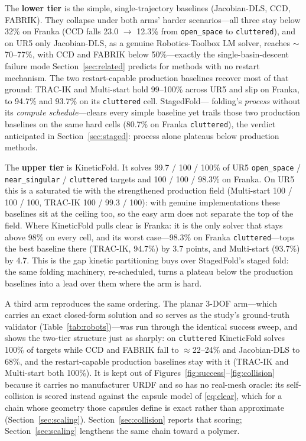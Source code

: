 \documentclass[10pt,conference]{IEEEtran}
\begin{document}
The \textbf{lower tier} is the simple, single-trajectory baselines
(Jacobian-DLS, CCD, FABRIK). They collapse under both arms' harder
scenarios---all three stay below 32\% on Franka (CCD falls 23.0
$\rightarrow$ 12.3\% from \texttt{open\_space} to \texttt{cluttered}), and on UR5
only Jacobian-DLS, as a genuine Robotics-Toolbox LM solver, reaches
$\sim$70--77\%, with CCD and FABRIK below 50\%---exactly the
single-basin-descent failure mode Section~\ref{sec:related} predicts for methods
with no restart mechanism. The two restart-capable production baselines recover
most of that ground: TRAC-IK and Multi-start hold 99--100\% across UR5 and slip
on Franka, to 94.7\% and 93.7\% on its \texttt{cluttered} cell. StagedFold---
folding's \emph{process} without its \emph{compute schedule}---clears every
simple baseline yet trails those two production baselines on the same hard cells
(80.7\% on Franka \texttt{cluttered}), the verdict anticipated in
Section~\ref{sec:staged}: process alone plateaus below production methods.

% 
% 

The \textbf{upper tier} is KineticFold. It solves 99.7 / 100 / 100\% of UR5
\texttt{open\_space} / \texttt{near\_singular} / \texttt{cluttered} targets and
100 / 100 / 98.3\% on Franka. On UR5 this is a saturated tie with the
strengthened production field (Multi-start 100 / 100 / 100, TRAC-IK
100 / 99.3 / 100): with genuine implementations these baselines sit at the
ceiling too, so the easy arm does not separate the top of the field. Where
KineticFold pulls clear is Franka: it is the only solver that stays above 98\% on
every cell, and its worst case---98.3\% on Franka \texttt{cluttered}---tops the
best baseline there (TRAC-IK, 94.7\%) by 3.7 points, and Multi-start (93.7\%) by
4.7. This is the gap kinetic partitioning buys over StagedFold's staged fold: the
same folding machinery, re-scheduled, turns a plateau below the production
baselines into a lead over them where the arm is hard.

A third arm reproduces the same ordering. The planar 3-DOF arm---which carries an
exact closed-form solution and so serves as the study's ground-truth validator
(Table~\ref{tab:robots})---was run through the identical success sweep, and shows
the two-tier structure just as sharply: on \texttt{cluttered} KineticFold solves
100\% of targets while CCD and FABRIK fall to $\approx$22--24\% and Jacobian-DLS
to 68\%, and the restart-capable production baselines stay with it (TRAC-IK and
Multi-start both 100\%). It is kept out of Figures~\ref{fig:success}--\ref{fig:collision}
because it carries no manufacturer URDF and so has no real-mesh oracle: its
self-collision is scored instead against the capsule model of \eqref{eq:clear},
which for a chain whose geometry those capsules define is exact rather than
approximate (Section~\ref{sec:scaling}). Section~\ref{sec:collision} reports that
scoring; Section~\ref{sec:scaling} lengthens the same chain toward a polymer.
\end{document}
